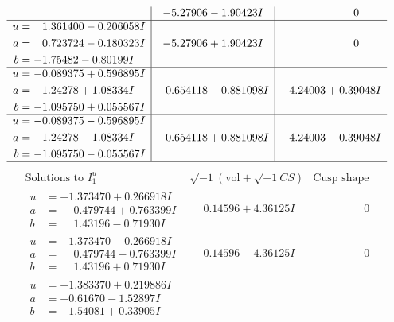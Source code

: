 \documentclass[1p]{elsarticle_modified}
\theoremstyle{definition}
\newcommand{\I}{\sqrt{-1}}
\begin{document}
$$\begin{array}{c|c|c}
 & -5.27906 - 1.90423 I & \phantom{-0.000000 } 0 \\ \hline\begin{aligned}
u &= \phantom{-}1.361400 - 0.206058 I \\
a &= \phantom{-}0.723724 - 0.180323 I \\
b &= -1.75482 - 0.80199 I\end{aligned}
 & -5.27906 + 1.90423 I & \phantom{-0.000000 } 0 \\ \hline\begin{aligned}
u &= -0.089375 + 0.596895 I \\
a &= \phantom{-}1.24278 + 1.08334 I \\
b &= -1.095750 + 0.055567 I\end{aligned}
 & -0.654118 - 0.881098 I & -4.24003 + 0.39048 I \\ \hline\begin{aligned}
u &= -0.089375 - 0.596895 I \\
a &= \phantom{-}1.24278 - 1.08334 I \\
b &= -1.095750 - 0.055567 I\end{aligned}
 & -0.654118 + 0.881098 I & -4.24003 - 0.39048 I\\
 \hline 
 \end{array}$$\newpage$$\begin{array}{c|c|c}  
\text{Solutions to }I^u_{1}& \I (\text{vol} + \sqrt{-1}CS) & \text{Cusp shape}\\
 \hline 
\begin{aligned}
u &= -1.373470 + 0.266918 I \\
a &= \phantom{-}0.479744 + 0.763399 I \\
b &= \phantom{-}1.43196 - 0.71930 I\end{aligned}
 & \phantom{-}0.14596 + 4.36125 I & \phantom{-0.000000 } 0 \\ \hline\begin{aligned}
u &= -1.373470 - 0.266918 I \\
a &= \phantom{-}0.479744 - 0.763399 I \\
b &= \phantom{-}1.43196 + 0.71930 I\end{aligned}
 & \phantom{-}0.14596 - 4.36125 I & \phantom{-0.000000 } 0 \\ \hline\begin{aligned}
u &= -1.383370 + 0.219886 I \\
a &= -0.61670 - 1.52897 I \\
b &= -1.54081 + 0.33905 I\end{aligned}

\end{array}$$
\end{document}
